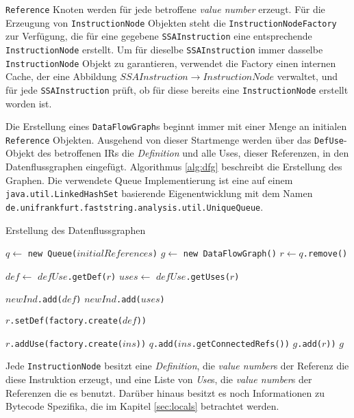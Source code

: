 \texttt{Reference} Knoten werden für jede betroffene \textit{value number} erzeugt. Für
die Erzeugung von \texttt{InstructionNode} Objekten steht die 
\texttt{InstructionNodeFactory} zur Verfügung, die für eine gegebene 
\texttt{SSAInstruction} eine entsprechende \texttt{InstructionNode} erstellt. Um
für dieselbe \texttt{SSAInstruction} immer dasselbe \texttt{InstructionNode} 
Objekt zu garantieren, verwendet die Factory einen internen Cache, der eine 
Abbildung $SSAInstruction \rightarrow InstructionNode$ verwaltet, und für jede 
\texttt{SSAInstruction} prüft, ob für diese bereits eine \texttt{InstructionNode} 
erstellt worden ist.

Die Erstellung eines \texttt{DataFlowGraph}s beginnt immer mit einer Menge an 
initialen \texttt{Reference} Objekten. Ausgehend von dieser Startmenge werden über 
das \texttt{DefUse}-Objekt des betroffenen IRs die \textit{Definition} und alle Uses, 
dieser Referenzen, in den Datenflussgraphen eingefügt. Algorithmus \ref{alg:dfg} 
beschreibt die Erstellung des Graphen. Die verwendete Queue Implementierung ist eine 
auf einem \texttt{java.util.LinkedHashSet} basierende Eigenentwicklung mit dem Namen
\texttt{de.unifrankfurt.faststring.analysis.util.UniqueQueue}.

\begin{algorithm}[H]
	\caption{Erstellung des Datenflussgraphen}\label{alg:dfg}
	\begin{algorithmic}[1]
		\STATE $q \gets$ \texttt{new Queue($initialReferences$)}
		\STATE $g \gets$ \texttt{new DataFlowGraph()}
			\STATE $r \gets q$\texttt{.remove()}

				\STATE $def \gets$ \texttt{$defUse$.getDef($r$)}
				\STATE $uses \gets$ \texttt{$defUse$.getUses($r$)}

				\STATE \texttt{$newInd$.add($def$)}
				\STATE \texttt{$newInd$.add($uses$)}

				\STATE \texttt{$r$.setDef(factory.create($def$))}

					\STATE \texttt{$r$.addUse(factory.create($ins$))}
				\ENDFOR
					\STATE \texttt{$q$.add($ins$.getConnectedRefs())}
				\ENDFOR
				\STATE \texttt{$g$.add($r$))}
			\ENDIF
		\ENDWHILE
		\RETURN $g$
	\end{algorithmic}
\end{algorithm}

Jede \texttt{InstructionNode} besitzt eine \textit{Definition}, die \textit{value number}s der Referenz 
die diese Instruktion erzeugt, und eine Liste von \textit{Use}s, die \textit{value number}s der Referenzen 
die es benutzt. Darüber hinaus besitzt es noch Informationen zu Bytecode Spezifika, die 
im Kapitel \ref{sec:locals} betrachtet werden.

